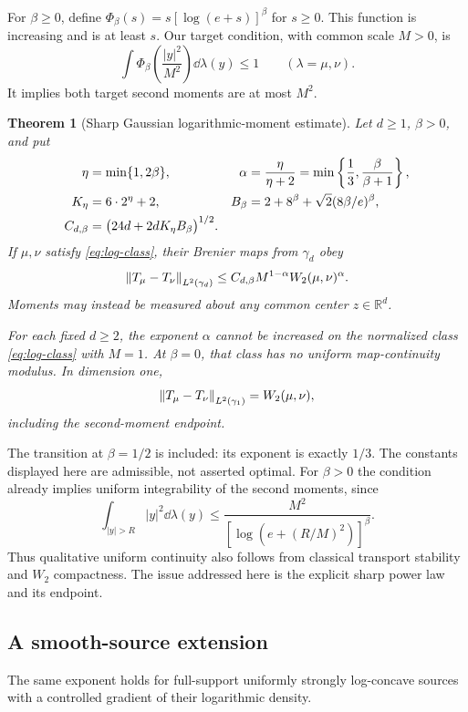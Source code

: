 \documentclass[11pt]{article}
\numberwithin{equation}{section}
\newtheorem{theorem}{Theorem}[section]
\theoremstyle{remark}\newtheorem{remark}[theorem]{Remark}
\newcommand{\R}{\mathbb R}\newcommand{\E}{\mathbb E}
\begin{document}
For $\beta\ge0$, define $\Phi_\beta(s)=s[\log(e+s)]^\beta$ for $s\ge0$. This function is increasing and is at least $s$. Our target condition, with common scale $M>0$, is
\begin{equation}\label{eq:log-class}
 \int\Phi_\beta\left(\frac{|y|^2}{M^2}\right)\dd\lambda(y)\le1
 \qquad(\lambda=\mu,\nu).
\end{equation}
It implies both target second moments are at most $M^2$.

\begin{theorem}[Sharp Gaussian logarithmic-moment estimate]\label{thm:log}
Let $d\ge1$, $\beta>0$, and put
\begin{align}
 \eta&=\min\{1,2\beta\},&
 \alpha&=\frac\eta{\eta+2}=\min\left\{\frac13,\frac\beta{\beta+1}\right\},\label{eq:eta-alpha}\\
 K_\eta&=6\cdot2^\eta+2,&
 B_\beta&=2+8^\beta+\sqrt2(8\beta/e)^\beta,\label{eq:constants}\\
 C_{d,\beta}&=\bigl(24d+2dK_\eta B_\beta\bigr)^{1/2}.&&\notag
\end{align}
If $\mu,\nu$ satisfy \eqref{eq:log-class}, their Brenier maps from $\gamma_d$ obey
\begin{equation}\label{eq:main-log}
 \left\lVert T_\mu-T_\nu\right\rVert_{L^2(\gamma_d)}
 \le C_{d,\beta}M^{1-\alpha}W_2(\mu,\nu)^\alpha.
\end{equation}
Moments may instead be measured about any common center $z\in\R^d$.

For each fixed $d\ge2$, the exponent $\alpha$ cannot be increased on the normalized class \eqref{eq:log-class} with $M=1$. At $\beta=0$, that class has no uniform map-continuity modulus. In dimension one,
\begin{equation}\label{eq:one-dimensional}
 \left\lVert T_\mu-T_\nu\right\rVert_{L^2(\gamma_1)}=W_2(\mu,\nu),
\end{equation}
including the second-moment endpoint.
\end{theorem}

The transition at $\beta=1/2$ is included: its exponent is exactly $1/3$. The constants displayed here are admissible, not asserted optimal. For $\beta>0$ the condition already implies uniform integrability of the second moments, since
\[
 \int_{|y|>R}|y|^2\dd\lambda(y)
 \le\frac{M^2}{[\log(e+(R/M)^2)]^\beta}.
\]
Thus qualitative uniform continuity also follows from classical transport stability and $W_2$ compactness. The issue addressed here is the explicit sharp power law and its endpoint.

\subsection{A smooth-source extension}
The same exponent holds for full-support uniformly strongly log-concave sources with a controlled gradient of their logarithmic density.
\end{document}
